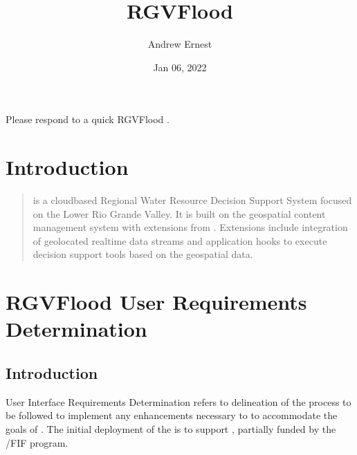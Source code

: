\documentclass[letterpaper,10pt,english]{sphinxmanual}
\title{RGVFlood}
\date{Jan 06, 2022}
\author{Andrew Ernest}
\begin{document}
\pagestyle{empty}
\sphinxmaketitle
\pagestyle{plain}
\sphinxtableofcontents
\pagestyle{normal}
\label{\detokenize{index::doc}}


\sphinxAtStartPar
Please respond to a quick RGVFlood .


\chapter{Introduction}
\label{\detokenize{introduction:introduction}}\label{\detokenize{introduction::doc}}\begin{quote}

\sphinxAtStartPar
{\hyperref[\detokenize{glossary:term-RGVFlood}]{}} is a cloud\sphinxhyphen{}based Regional Water Resource Decision Support System focused on the Lower Rio Grande Valley. It is built on the  geospatial content management system with extensions from . {\hyperref[\detokenize{glossary:term-REON}]{}} Extensions  include integration of geolocated real\sphinxhyphen{}time data streams and application hooks to execute decision support tools based on the geospatial data.
\end{quote}


\chapter{RGVFlood User Requirements Determination}
\label{\detokenize{requirements/index:rgvflood-user-requirements-determination}}\label{\detokenize{requirements/index::doc}}

\section{Introduction}
\label{\detokenize{requirements/introduction/index:introduction}}\label{\detokenize{requirements/introduction/index::doc}}
\sphinxAtStartPar
User Interface Requirements Determination refers to delineation of the process to be followed to implement any enhancements necessary to {\hyperref[\detokenize{glossary:term-REON.cc}]{}} to accommodate the goals of {\hyperref[\detokenize{glossary:term-REON-WM}]{}}. The initial deployment of the {\hyperref[\detokenize{glossary:term-REON-WM}]{}} is to support {\hyperref[\detokenize{glossary:term-RGVFlood}]{}}, partially funded by the {\hyperref[\detokenize{glossary:term-TWDB}]{}}/FIF program.
\end{document}
